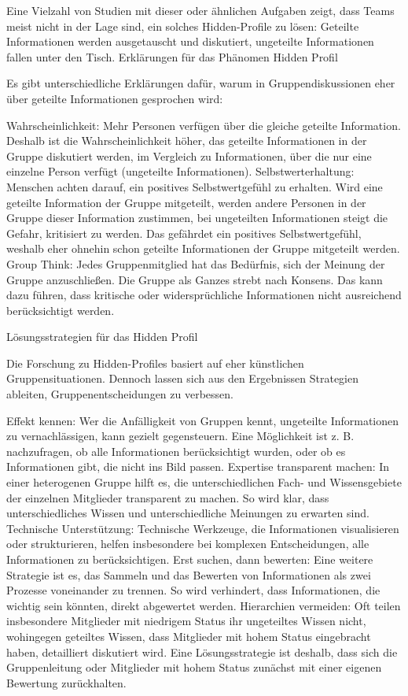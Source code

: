 Eine Vielzahl von Studien mit dieser oder ähnlichen Aufgaben zeigt, dass Teams meist nicht in der Lage sind,
ein solches Hidden-Profile zu lösen: Geteilte Informationen werden ausgetauscht und diskutiert, ungeteilte
Informationen fallen unter den Tisch.
Erklärungen für das Phänomen Hidden Profil

Es gibt unterschiedliche Erklärungen dafür, warum in Gruppendiskussionen eher über geteilte Informationen
gesprochen wird:

Wahrscheinlichkeit: Mehr Personen verfügen über die gleiche geteilte Information. Deshalb ist die
Wahrscheinlichkeit höher, das geteilte Informationen in der Gruppe diskutiert werden, im Vergleich zu
Informationen, über die nur eine einzelne Person verfügt (ungeteilte Informationen).
Selbstwerterhaltung: Menschen achten darauf, ein positives Selbstwertgefühl zu erhalten. Wird eine geteilte
Information der Gruppe mitgeteilt, werden andere Personen in der Gruppe dieser Information zustimmen, bei
ungeteilten Informationen steigt die Gefahr, kritisiert zu werden. Das gefährdet ein positives
Selbstwertgefühl, weshalb eher ohnehin schon geteilte Informationen der Gruppe mitgeteilt werden.
Group Think: Jedes Gruppenmitglied hat das Bedürfnis, sich der Meinung der Gruppe anzuschließen. Die Gruppe
als Ganzes strebt nach Konsens. Das kann dazu führen, dass kritische oder widersprüchliche Informationen
nicht ausreichend berücksichtigt werden.

Lösungsstrategien für das Hidden Profil

Die Forschung zu Hidden-Profiles basiert auf eher künstlichen Gruppensituationen. Dennoch lassen sich aus den
Ergebnissen Strategien ableiten, Gruppenentscheidungen zu verbessen.

Effekt kennen: Wer die Anfälligkeit von Gruppen kennt, ungeteilte Informationen zu vernachlässigen, kann
gezielt gegensteuern. Eine Möglichkeit ist z. B. nachzufragen, ob alle Informationen berücksichtigt wurden,
oder ob es Informationen gibt, die nicht ins Bild passen.
Expertise transparent machen: In einer heterogenen Gruppe hilft es, die unterschiedlichen Fach- und
Wissensgebiete der einzelnen Mitglieder transparent zu machen. So wird klar, dass unterschiedliches Wissen
und unterschiedliche Meinungen zu erwarten sind.
Technische Unterstützung: Technische Werkzeuge, die Informationen visualisieren oder strukturieren, helfen
insbesondere bei komplexen Entscheidungen, alle Informationen zu berücksichtigen.
Erst suchen, dann bewerten: Eine weitere Strategie ist es, das Sammeln und das Bewerten von Informationen als
zwei Prozesse voneinander zu trennen. So wird verhindert, dass Informationen, die wichtig sein könnten,
direkt abgewertet werden.
Hierarchien vermeiden: Oft teilen insbesondere Mitglieder mit niedrigem Status ihr ungeteiltes Wissen nicht,
wohingegen geteiltes Wissen, dass Mitglieder mit hohem Status eingebracht haben, detailliert diskutiert wird.
Eine Lösungsstrategie ist deshalb, dass sich die Gruppenleitung oder Mitglieder mit hohem Status zunächst mit
einer eigenen Bewertung zurückhalten.


